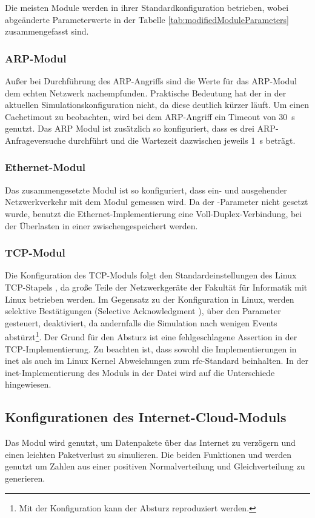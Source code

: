 Die meisten Module werden in ihrer Standardkonfiguration betrieben, wobei abgeänderte Parameterwerte   in der Tabelle \ref{tab:modifiedModuleParameters} zusammengefasst sind. 
\subsubsection{ARP-Modul}
Außer bei Durchführung des ARP-Angriffs sind die Werte für das ARP-Modul dem echten Netzwerk nachempfunden. Praktische Bedeutung hat der  in der aktuellen Simulationskonfiguration nicht, da diese deutlich kürzer läuft. Um einen Cachetimout zu beobachten, wird bei dem ARP-Angriff ein Timeout von \SI{30}{\second} genutzt. Das ARP Modul ist zusätzlich so konfiguriert, dass es drei ARP-Anfrageversuche durchführt und die Wartezeit dazwischen jeweils \SI{1}{\second} beträgt.

\subsubsection{Ethernet-Modul}
Das zusammengesetzte Modul  ist so konfiguriert, dass ein- und ausgehender Netzwerkverkehr mit dem Modul  gemessen wird. Da der -Parameter nicht gesetzt wurde, benutzt die Ethernet-Implementierung eine Voll-Duplex-Verbindung, bei der Überlasten in einer  zwischengespeichert werden. 

\subsubsection{TCP-Modul}
Die Konfiguration des TCP-Moduls folgt den Standardeinstellungen des Linux TCP-Stapels \cite{ManTCP}, da große Teile der Netzwerkgeräte der Fakultät für Informatik mit Linux betrieben werden. Im Gegensatz zu der Konfiguration in Linux, werden selektive Bestätigungen (Selective Acknowledgment \cite{RFC2018}), über den Parameter  gesteuert, deaktiviert, da andernfalls die Simulation nach wenigen Events abstürzt\footnote{Mit der Konfiguration \ini{[KeinAngriffSackCrash]} kann der Absturz reproduziert werden.}. Der Grund für den Absturz ist eine fehlgeschlagene Assertion in der TCP-Implementierung. Zu beachten ist, dass sowohl die Implementierungen in \gls{inet} als auch im Linux Kernel Abweichungen zum \gls{rfc}-Standard beinhalten. In der \gls{inet}-Implementierung des Moduls in der Datei  wird auf die Unterschiede hingewiesen. 

\subsection{Konfigurationen des Internet-Cloud-Moduls}
Das Modul  wird genutzt, um Datenpakete über das Internet zu verzögern und einen leichten Paketverlust zu simulieren. Die beiden Funktionen  und  werden genutzt um Zahlen aus einer positiven Normalverteilung und Gleichverteilung zu generieren.

